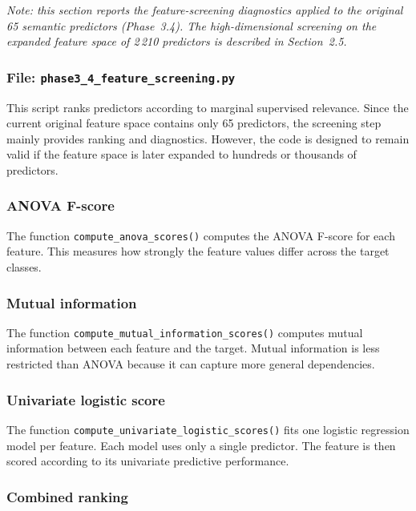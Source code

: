 \documentclass{ipgpmaster}
\begin{document}
\noindent\textit{Note: this section reports the feature-screening diagnostics
applied to the original 65 semantic predictors (Phase~3.4). The
high-dimensional screening on the expanded feature space of 2\,210
predictors is described in Section~2.5.}

\medskip

\subsubsection{File: \texttt{phase3\_4\_feature\_screening.py}}

This script ranks predictors according to marginal supervised relevance. Since the current original feature space contains only 65 predictors, the screening step mainly provides ranking and diagnostics. However, the code is designed to remain valid if the feature space is later expanded to hundreds or thousands of predictors.

\subsubsection{ANOVA F-score}

The function \texttt{compute\_anova\_scores()} computes the ANOVA F-score for each feature. This measures how strongly the feature values differ across the target classes.

\subsubsection{Mutual information}

The function \texttt{compute\_mutual\_information\_scores()} computes mutual information between each feature and the target. Mutual information is less restricted than ANOVA because it can capture more general dependencies.

\subsubsection{Univariate logistic score}

The function \texttt{compute\_univariate\_logistic\_scores()} fits one logistic regression model per feature. Each model uses only a single predictor. The feature is then scored according to its univariate predictive performance.

\subsubsection{Combined ranking}
\end{document}
